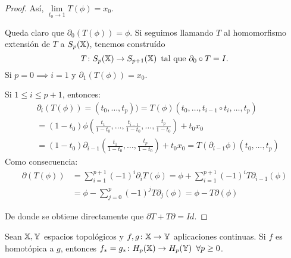 \begin{proof}
  Así, $\lim\limits_{t_0 \to 1} T(\phi) = x_0$.

  Queda claro que $\partial_0(T(\phi)) = \phi$. Si seguimos llamando $T$ al homomorfismo extensión de $T$ a $S_{p}({\mathbb X})$, tenemos construído
  \[  T \colon S_{p}({\mathbb X}) \to S_{p+1}({\mathbb X}) \hspace{0.5em} \text{tal que } \partial_0 \circ  T = I. \]
  Si $p = 0 \implies i = 1$ y $\partial_1( T(\phi)) = x_0$.

  Si $1 \leq i \leq p+1$, entonces:
  \begin{align*}
    &\partial_i( T(\phi))=(t_0,\dots,t_p)) =  T(\phi)(t_0, \dots, t_{i-1} \circ t_i, \dots, t_p) \\
    &= (1-t_0)\phi(\frac{t_1}{1-t_0}, \dots, \frac{t_{i-1}}{1-t_0}, \dots, \frac{t_p}{1-t_0}) + t_0 x_0 \\
    &= (1-t_0)\partial_{i-1}(\frac{t_1}{1-t_0}, \dots, \frac{t_p}{1-t_0}) + t_0 x_0 = T(\partial_{i-1} \phi)(t_0, \dots, t_p)
  \end{align*}
  Como consecuencia:
  \begin{align*}
    \partial( T(\phi)) &= \sum\limits_{i = 1}^{p+1} (-1)^i \partial_i  T(\phi) = \phi + \sum\limits_{i = 1}^{p+1} (-1)^i  T \partial_{i-1}(\phi) \\
    &= \phi - \sum\limits_{j = 0}^p (-1)^j  T \partial_j(\phi) = \phi -  T \partial(\phi)
  \end{align*}

  De donde se obtiene directamente que $\partial  T +  T \partial = Id$.
\end{proof}

\begin{theorem}
  Sean ${\mathbb X}, {\mathbb Y}$ espacios topológicos y $f, g \colon {\mathbb X} \to {\mathbb Y}$ aplicaciones continuas. Si $f$ es homotópica a $g$,
  entonces $f_* = g_* \colon H_p({\mathbb X}) \to H_p({\mathbb Y}) \hspace{0.5em} \forall p \geq 0$.
\end{theorem}

